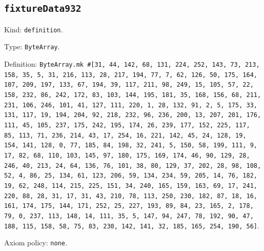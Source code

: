 \documentclass[11pt]{article}
\begin{document}
\subsection*{\texttt{fixtureData932}}
\noindent Kind: \texttt{definition}.\par
\noindent Type: \texttt{ByteArray}.\par
\noindent Definition: \texttt{ByteArray.mk \#[31, 44, 142, 68, 131, 224, 252, 143, 73, 213, 158, 35, 5, 31, 216, 113, 28, 217, 194, 77, 7, 62, 126, 50, 175, 164, 107, 209, 197, 133, 67, 194, 39, 117, 211, 98, 249, 15, 105, 57, 22, 158, 232, 86, 242, 172, 83, 103, 144, 195, 181, 35, 168, 156, 68, 211, 231, 106, 246, 101, 41, 127, 111, 220, 1, 28, 132, 91, 2, 5, 175, 33, 131, 117, 19, 194, 204, 92, 218, 232, 96, 236, 200, 13, 207, 201, 176, 111, 45, 105, 237, 175, 242, 195, 174, 26, 239, 177, 152, 225, 117, 85, 113, 71, 236, 214, 43, 17, 254, 16, 221, 142, 45, 24, 128, 19, 154, 141, 128, 0, 77, 185, 84, 198, 32, 241, 5, 150, 58, 199, 111, 9, 17, 82, 68, 110, 103, 145, 97, 180, 175, 169, 174, 46, 90, 129, 28, 246, 40, 213, 24, 64, 136, 76, 101, 38, 80, 129, 37, 202, 28, 98, 108, 52, 4, 86, 25, 134, 61, 123, 206, 59, 134, 234, 59, 205, 14, 76, 182, 19, 62, 248, 114, 215, 225, 151, 34, 240, 165, 159, 163, 69, 17, 241, 220, 88, 28, 31, 17, 31, 43, 210, 78, 113, 250, 230, 182, 87, 18, 16, 161, 174, 175, 144, 171, 252, 25, 227, 193, 89, 84, 23, 165, 2, 178, 79, 0, 237, 113, 148, 14, 111, 35, 5, 147, 94, 247, 78, 192, 90, 47, 188, 115, 158, 58, 75, 83, 230, 142, 141, 32, 185, 165, 254, 190, 56]}.\par
\noindent Axiom policy: \texttt{none}.\par
\end{document}
